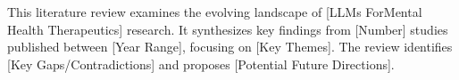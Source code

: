This literature review examines the evolving landscape of [LLMs For ​Mental Health Therapeutics​] research. 
It synthesizes key findings from [Number] studies published between [Year Range], focusing on [Key Themes].  
The review identifies [Key Gaps/Contradictions] and proposes [Potential Future Directions].